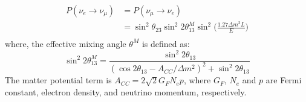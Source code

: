 \documentclass[12pt]{article}
\begin{document}
\begin{multicols}{2}
        \begin{align*}
            P(\nu_{e} \rightarrow \nu_{\mu})    &= P(\nu_{\mu}\rightarrow \nu_{e})\\
                                                &= \sin^{2} \theta_{23} \sin^{2} 2\theta_{13}^{M} \sin^{2}\Big( \frac{1.27 \Delta m^{2} L}{E} \Big)\\
        \end{align*}
        where, the effective mixing angle $\theta^{M}$ is defined as:
        \[
            \sin^{2}2\theta_{13}^{M} = \frac{\sin^{2}2\theta_{13}}{(\cos2\theta_{13} - A_{CC}/\Delta m^{2})^{2} + \sin^{2}2\theta_{13}}
        \]
        The matter potential term is $A_{CC} = 2\sqrt{2}G_{F}N_{e}p$, where $G_{F}$, $N_{e}$ and $p$ are Fermi constant, electron density, and neutrino momentum, respectively.


\end{multicols}
\end{document}
